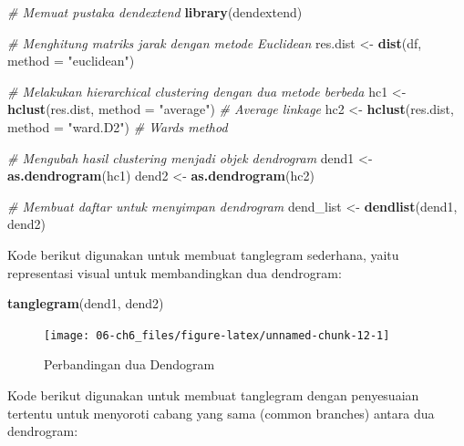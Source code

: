 \documentclass[
  oneside]{book}
\newenvironment{Shaded}{\begin{snugshade}}{\end{snugshade}}
\newcommand{\AttributeTok}[1]{\textcolor[rgb]{0.13,0.29,0.53}{#1}}
\newcommand{\CommentTok}[1]{\textcolor[rgb]{0.56,0.35,0.01}{\textit{#1}}}
\newcommand{\FunctionTok}[1]{\textcolor[rgb]{0.13,0.29,0.53}{\textbf{#1}}}
\newcommand{\NormalTok}[1]{#1}
\newcommand{\OtherTok}[1]{\textcolor[rgb]{0.56,0.35,0.01}{#1}}
\newcommand{\StringTok}[1]{\textcolor[rgb]{0.31,0.60,0.02}{#1}}
\begin{document}
\begin{Shaded}
\begin{Highlighting}[]
\CommentTok{\# Memuat pustaka dendextend}
\FunctionTok{library}\NormalTok{(dendextend)}

\CommentTok{\# Menghitung matriks jarak dengan metode Euclidean}
\NormalTok{res.dist }\OtherTok{\textless{}{-}} \FunctionTok{dist}\NormalTok{(df, }\AttributeTok{method =} \StringTok{"euclidean"}\NormalTok{)}

\CommentTok{\# Melakukan hierarchical clustering dengan dua metode berbeda}
\NormalTok{hc1 }\OtherTok{\textless{}{-}} \FunctionTok{hclust}\NormalTok{(res.dist, }\AttributeTok{method =} \StringTok{"average"}\NormalTok{)  }\CommentTok{\# Average linkage}
\NormalTok{hc2 }\OtherTok{\textless{}{-}} \FunctionTok{hclust}\NormalTok{(res.dist, }\AttributeTok{method =} \StringTok{"ward.D2"}\NormalTok{)  }\CommentTok{\# Ward\textquotesingle{}s method}

\CommentTok{\# Mengubah hasil clustering menjadi objek dendrogram}
\NormalTok{dend1 }\OtherTok{\textless{}{-}} \FunctionTok{as.dendrogram}\NormalTok{(hc1)}
\NormalTok{dend2 }\OtherTok{\textless{}{-}} \FunctionTok{as.dendrogram}\NormalTok{(hc2)}

\CommentTok{\# Membuat daftar untuk menyimpan dendrogram}
\NormalTok{dend\_list }\OtherTok{\textless{}{-}} \FunctionTok{dendlist}\NormalTok{(dend1, dend2)}
\end{Highlighting}
\end{Shaded}

Kode berikut digunakan untuk membuat tanglegram sederhana, yaitu representasi visual untuk membandingkan dua dendrogram:

\begin{Shaded}
\begin{Highlighting}[]
\FunctionTok{tanglegram}\NormalTok{(dend1, dend2)}
\end{Highlighting}
\end{Shaded}

\begin{figure}[h]

{\centering \texttt{[image: 06-ch6\_files/figure-latex/unnamed-chunk-12-1]} 

}

\caption{Perbandingan dua Dendogram}\label{fig:unnamed-chunk-12}
\end{figure}

Kode berikut digunakan untuk membuat tanglegram dengan penyesuaian tertentu untuk menyoroti cabang yang sama (common branches) antara dua dendrogram:
\end{document}
